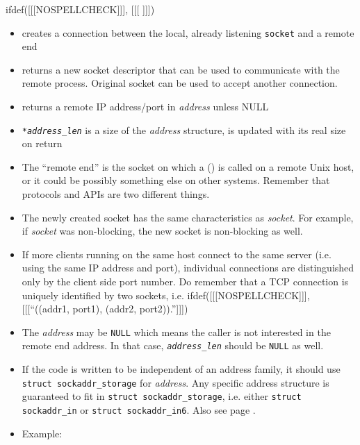 

\begin{slide}
ifdef([[[NOSPELLCHECK]]], [[[
]]])
\begin{itemize}
\item creates a connection between the local, already listening \texttt{socket}
and a remote end
\item returns a new socket descriptor that can be used to communicate with the
remote process.  Original socket can be used to accept another connection.
\item returns a remote IP address/port in \emph{address} unless NULL
\item \emph{\texttt{*address\_len}} is a size of the \emph{address} structure,
is updated with its real size on return
\end{itemize}
\end{slide}


\begin{itemize}
\item The ``remote end'' is the socket on which a () is
called on a remote Unix host, or it could be possibly something else on other
systems.  Remember that protocols and APIs are two different things.
\item The newly created socket has the same characteristics as \emph{socket}.
For example, if \emph{socket} was non-blocking, the new socket is non-blocking
as well.
\item If more clients running on the same host connect to the same server (i.e.
using the same IP address and port), individual connections are distinguished
only by the client side port number.  Do remember that a TCP connection is
uniquely identified by two sockets, i.e.
ifdef([[[NOSPELLCHECK]]], [[[``((addr1, port1), (addr2, port2)).'']]])
\item The \emph{address} may be \texttt{NULL} which means the caller is not
interested in the remote end address. In that case,
\emph{\texttt{address\_len}} should be \texttt{NULL} as well.
\item If the code is written to be independent of an address family, it should
use \texttt{struct sockaddr\_storage} for \emph{address}.  Any specific address
structure is guaranteed to fit in \texttt{struct sockaddr\_storage}, i.e. either
\texttt{struct sockaddr\_in} or \texttt{struct sockaddr\_in6}.  Also see page
\pageref{TCPCLNTEXAMPLE}.
\item {} Example: 
\end{itemize}

